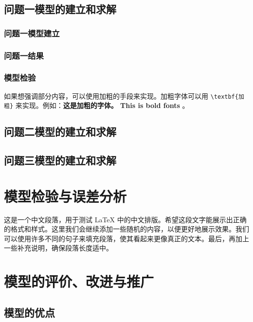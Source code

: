 \documentclass{cumcmthesis} %
\begin{document}
\subsection{问题一模型的建立和求解}

\subsubsection{问题一模型建立}

\subsubsection{问题一结果}

\subsubsection{模型检验}

如果想强调部分内容，可以使用加粗的手段来实现。加粗字体可以用
\verb|\textbf{加粗}| 来实现。例如：\textbf{这是加粗的字体。 This is bold fonts} 。



\subsection{问题二模型的建立和求解}

\subsection{问题三模型的建立和求解}


\section{模型检验与误差分析}

这是一个中文段落，用于测试 LaTeX 中的中文排版。希望这段文字能展示出正确的格式和样式。这里我们会继续添加一些随机的内容，以便更好地展示效果。我们可以使用许多不同的句子来填充段落，使其看起来更像真正的文本。最后，再加上一些补充说明，确保段落长度适中。

\section{模型的评价、改进与推广}


\subsection{模型的优点}
\end{document}
